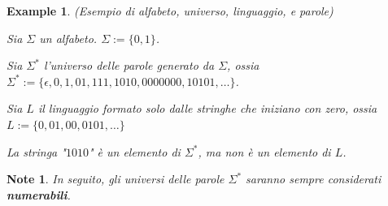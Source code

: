 \documentclass{report}
\newtheorem{note}{Note}
\newtheorem{xpl}{Example}
\begin{document}
\begin{xpl}{(Esempio di alfabeto, universo, linguaggio, e parole)}

  Sia $\Sigma$ un alfabeto. $\Sigma := \{0,1\}$.

  Sia $\Sigma^*$ l'universo delle parole generato da $\Sigma$, ossia $\Sigma^* := \{\epsilon, 0, 1, 01, 111, 1010, 0000000, 10101, \dots \}$.
  
  Sia $L$ il linguaggio formato solo dalle stringhe che iniziano con zero, ossia $L :=\{0, 01, 00, 0101, \dots\}$

  La stringa "$1010$" è un elemento di $\Sigma^*$, ma non è un elemento di $L$.
\end{xpl}

\begin{note}
  In seguito, gli universi delle parole $\Sigma^*$ saranno sempre considerati \textbf{numerabili}.
\end{note}
\end{document}
